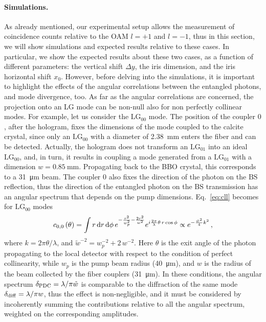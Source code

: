 \documentclass[
reprint,
amsmath,amssymb,
aps,
showkeys
]{revtex4-2}
\begin{document}
\paragraph*{Simulations.}
As already mentioned, our experimental setup allows the measurement of coincidence counts relative to the OAM $l=+1$ and $l=-1$, thus in this section, we will show simulations and expected results relative to these cases.
In particular, we show the expected results about these two cases, as a function of different parameters: the vertical shift $\Delta y$, the iris dimension, and the iris horizontal shift $x_0$.
However, before delving into the simulations, it is important to highlight the effects of the angular correlations between the entangled photons, and mode divergence, too.
As far as the angular correlations are concerned, the projection onto an LG mode can be non-null also for non perfectly collinear modes.
For example, let us consider the $\mathrm{LG}_{00}$ mode.
The position of the coupler $0$, after the hologram, fixes the dimensions of the mode coupled to the calcite crystal, since only an $\mathrm{LG}_{00}$ with a diameter of \SI{2.38}{\milli\meter} enters the fiber and can be detected.
Actually, the hologram does not transform an $\mathrm{LG}_{01}$ into an ideal $\mathrm{LG}_{00}$, and, in turn, it results in coupling a mode generated from a $\mathrm{LG}_{01}$ with a dimension $w = \SI{0.85}{\milli\meter}$.
Propagating back to the BBO crystal, this corresponds to a \SI{31}{\micro\meter} beam.
The coupler $0$ also fixes the direction of the photon on the $\mathrm{BS}$ reflection, thus the direction of the entangled photon on the $\mathrm{BS}$ transmission has an angular spectrum that depends on the pump dimensions.
Eq.~\ref{eq:cll} becomes for $\mathrm{LG}_{00}$ modes
%
\begin{align}
    c_{0,0}\left(\theta\right) = 
    \int r\,{\rm d}r\,{\rm d}\phi \,
    e^{- \frac{r^2}{w_p^2} - \frac{2 r^2 }{w^2}}
    e^{i\frac{2\pi}{\lambda}\theta \, r \cos{\phi}}
    \propto
    e^{-\frac{\tilde{w}^2}{4}k^2}
    \, ,
\end{align}
%
where $k = 2 \pi \theta / \lambda$, and $\tilde{w}^{-2} = w_p^{-2} + 2\,w^{-2}$.
Here $\theta$ is the exit angle of the photon propagating to the local detector with respect to the condition of perfect collinearity, while $w_p$ is the pump beam radius (\SI{40}{\micro\meter}), and $w$ is the radius of the beam collected by the fiber couplers (\SI{31}{\micro\meter}).
In these conditions, the angular spectrum $\delta_{\rm PDC} = \lambda/\pi\tilde{w}$ is comparable to the diffraction of the same mode $\delta_{\rm diff} = \lambda/\pi w$, thus the effect is non-negligible, and it must be considered by incoherently summing the contributions relative to all the angular spectrum, weighted on the corresponding amplitudes.
\end{document}
